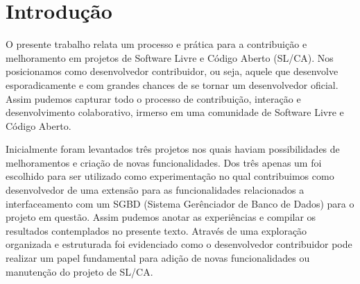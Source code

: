 % 
% 
% 
% 

\section{Introdução} \label{sec:introducao}

O presente trabalho relata um processo e prática para a contribuição e melhoramento em projetos de Software Livre e Código Aberto (SL/CA). Nos posicionamos como desenvolvedor contribuidor, ou seja, aquele que desenvolve esporadicamente e com grandes chances de se tornar um desenvolvedor oficial. Assim pudemos capturar todo o processo de contribuição, interação e desenvolvimento colaborativo, irmerso em uma comunidade de Software Livre e Código Aberto.
 
Inicialmente foram levantados três projetos nos quais haviam possibilidades de melhoramentos e criação de novas funcionalidades. Dos três apenas um foi escolhido para ser utilizado como experimentação no qual contribuimos como desenvolvedor de uma extensão para as funcionalidades relacionados a interfaceamento com um SGBD (Sistema Gerênciador de Banco de Dados) para o projeto em questão. Assim pudemos anotar as experiências e compilar os resultados contemplados no presente texto. 
Através de uma exploração organizada e estruturada foi evidenciado como o desenvolvedor contribuidor pode realizar um papel fundamental para adição de novas funcionalidades ou manutenção do projeto de SL/CA.

